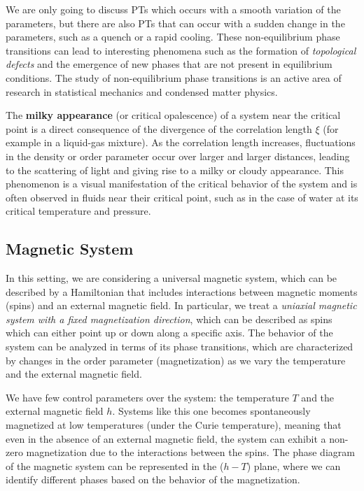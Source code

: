 We are only going to discuss PTs which occurs with a smooth variation of the parameters, but there are also PTs that can occur with a sudden change in the parameters, such as a quench or a rapid cooling. These non-equilibrium phase transitions can lead to interesting phenomena such as the formation of \textit{topological defects} and the emergence of new phases that are not present in equilibrium conditions. The study of non-equilibrium phase transitions is an active area of research in statistical mechanics and condensed matter physics.

\begin{remark}
    The \textbf{milky appearance} (or critical opalescence) of a system near the critical point is a direct consequence of the divergence of the correlation length \(\xi\) (for example in a liquid-gas mixture). As the correlation length increases, fluctuations in the density or order parameter occur over larger and larger distances, leading to the scattering of light and giving rise to a milky or cloudy appearance. This phenomenon is a visual manifestation of the critical behavior of the system and is often observed in fluids near their critical point, such as in the case of water at its critical temperature and pressure.
\end{remark}

\subsection{Magnetic System}

In this setting, we are considering a universal magnetic system, which can be described by a Hamiltonian that includes interactions between magnetic moments (spins) and an external magnetic field. In particular, we treat a \textit{uniaxial magnetic system with a fixed magnetization direction}, which can be described as spins which can either point up or down along a specific axis. The behavior of the system can be analyzed in terms of its phase transitions, which are characterized by changes in the order parameter (magnetization) as we vary the temperature and the external magnetic field.

We have few control parameters over the system: the temperature $T$ and the external magnetic field $h$. Systems like this one becomes spontaneously magnetized at low temperatures (under the Curie temperature), meaning that even in the absence of an external magnetic field, the system can exhibit a non-zero magnetization due to the interactions between the spins. The phase diagram of the magnetic system can be represented in the ($h-T$) plane, where we can identify different phases based on the behavior of the magnetization.

